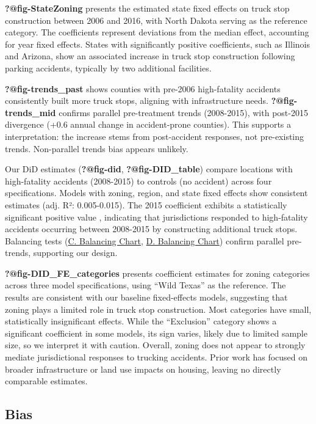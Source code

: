 \documentclass[
  12pt]{article}
\begin{document}
\textbf{?@fig-StateZoning} presents the estimated state fixed effects on
truck stop construction between 2006 and 2016, with North Dakota serving
as the reference category. The coefficients represent deviations from
the median effect, accounting for year fixed effects. States with
significantly positive coefficients, such as Illinois and Arizona, show
an associated increase in truck stop construction following parking
accidents, typically by two additional facilities.

\textbf{?@fig-trends\_past} shows counties with pre-2006 high-fatality
accidents consistently built more truck stops, aligning with
infrastructure needs. \textbf{?@fig-trends\_mid} confirms parallel
pre-treatment trends (2008-2015), with post-2015 divergence (+0.6 annual
change in accident-prone counties). This supports a interpretation: the
increase stems from post-accident responses, not pre-existing trends.
Non-parallel trends bias appears unlikely.

Our DiD estimates (\textbf{?@fig-did}, \textbf{?@fig-DID\_table})
compare locations with high-fatality accidents (2008-2015) to controls
(no accident) across four specifications. Models with zoning, region,
and state fixed effects show consistent estimates (adj. R²:
0.005-0.015). The 2015 coefficient exhibits a statistically significant
positive value , indicating that jurisdictions responded to
high-fatality accidents occurring between 2008-2015 by constructing
additional truck stops. Balancing tests
(\hyperref[sec-c.-balancing_chart_region]{C. Balancing Chart},
\hyperref[sec-D.balancing_chart_state]{D. Balancing Chart}) confirm
parallel pre-trends, supporting our design.

\textbf{?@fig-DID\_FE\_categories} presents coefficient estimates for
zoning categories across three model specifications, using ``Wild
Texas'' as the reference. The results are consistent with our baseline
fixed-effects models, suggesting that zoning plays a limited role in
truck stop construction. Most categories have small, statistically
insignificant effects. While the ``Exclusion'' category shows a
significant coefficient in some models, its sign varies, likely due to
limited sample size, so we interpret it with caution. Overall, zoning
does not appear to strongly mediate jurisdictional responses to trucking
accidents. Prior work has focused on broader infrastructure or land use
impacts on housing, leaving no directly comparable estimates.

\subsection{Bias}\label{bias}
\end{document}
